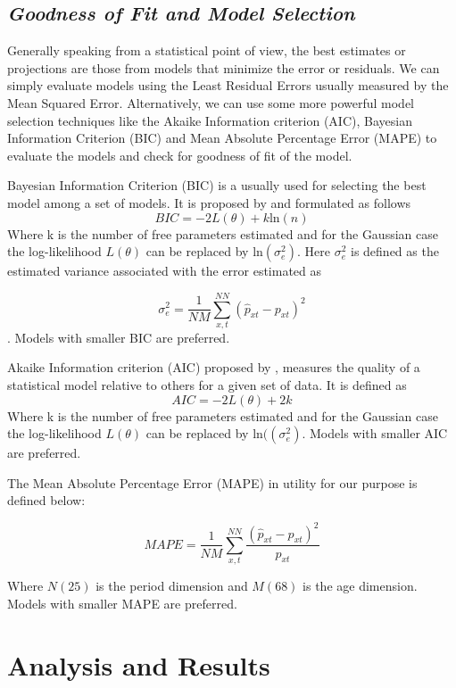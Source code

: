 \documentclass[11pt,letterpaper]{article}
\numberwithin{equation}{section}
\begin{document}
\subsection{\textit{Goodness of Fit and Model Selection}}
Generally speaking from a statistical point of view, the best estimates or projections are those from models that minimize the error or residuals.  We can simply evaluate models using the Least Residual Errors usually measured by the Mean Squared Error.
Alternatively, we can use some more powerful model selection techniques like the Akaike Information criterion (AIC), Bayesian Information Criterion (BIC) and Mean Absolute Percentage Error (MAPE) to evaluate the models and check for goodness of fit of the model.

Bayesian Information Criterion (BIC) is a usually used for selecting the best model among a set of models. It is proposed by \cite{Schwarz:1978} and formulated as follows
$$BIC =-2 L(\theta)+k\text{ln}(n)$$
Where k is the number of free parameters estimated and for the Gaussian case the log-likelihood  $L(\theta)$ can be replaced by $\text{ln}(\sigma_e^2 )$.
Here $\sigma_e^2$     is defined as the estimated variance associated with the error estimated as

$$\sigma_e^2 =\frac{1}{NM}\sum_{x,t}^{NN}(\hat p_{xt}-p_{xt})^2 $$.
Models with smaller BIC are preferred.

Akaike Information criterion (AIC) proposed by \cite{Akaike:1974}, measures the quality of a statistical model relative to others for a given set of data.  It is defined as
$$AIC =-2L(\theta)+2k$$
Where k is the number of free parameters estimated and for the Gaussian case the log-likelihood  $L(\theta)$ can be replaced by $\text{ln}((\sigma_e^2 )$. Models with smaller AIC are preferred.

The Mean Absolute Percentage Error (MAPE) in utility for our purpose is defined below:

$$MAPE=\frac{1}{NM}\sum_{x,t}^{NN} \frac{(\hat p_{xt}-p_{xt})^2}{p_{xt}}$$

Where $N(25)$ is the period dimension and $M(68)$ is the age dimension. Models with smaller MAPE are preferred.

\section{Analysis and Results}\label{sec:results}
\end{document}
